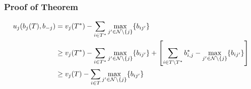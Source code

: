 \documentclass[aspectratio=1610]{beamer}
\begin{document}
\begin{frame}
	\frametitle{Proof of Theorem}
	\begin{align*}
		u_j(b_j(T),b_{-j}) & = v_j(T^*)-\sum\limits_{i\in T^*}\max\limits_{j'\in\mathcal{N}\setminus \{j\}}\{b_{ij'}\}                                                                                                      \\
		                   & \geq v_j(T^*)-\sum\limits_{i\in T^*} \max\limits_{j'\in\mathcal{N}\setminus \{j\}}\{b_{ij'}\} + \left[\sum_{i\in T\setminus T^*}b_{i,j}^*-\max\limits_{j'\in\mathcal{N}\setminus \{j\}}\{b_{ij'}\} \right] \\
		                   & \geq v_j(T)-\sum\limits_{i\in T}\max\limits_{j'\in \mathcal{N}\setminus \{j\}}\{b_{ij'}\}
	\end{align*}
\end{frame}
\end{document}
